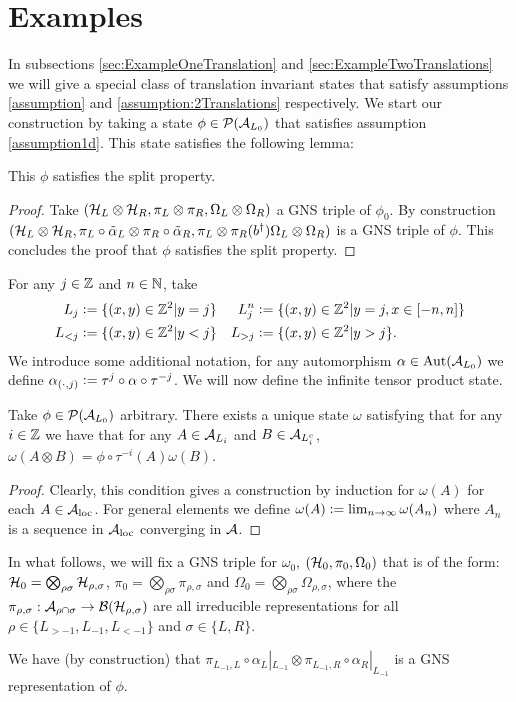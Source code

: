 \documentclass[11pt,a4paper,twoside]{article}
\numberwithin{equation}{section}
\begin{document}
	\section{Examples}\label{sec:examples}
	In subsections \ref{sec:ExampleOneTranslation} and \ref{sec:ExampleTwoTranslations} we will give a special class of translation invariant states that satisfy assumptions \ref{assumption} and \ref{assumption:2Translations} respectively. We start our construction by taking a state $\phi\in\PP(\AA_{L_0})$ that satisfies assumption \ref{assumption1d}. This state satisfies the following lemma:
	\begin{lemma}\label{lem:phiExampleConsistentWithConjectureSplitProperty}
		This $\phi$ satisfies the split property.
	\end{lemma}
	\begin{proof}
		Take $(\HH_L\otimes\HH_R,\pi_L\otimes\pi_R,\Omega_L\otimes\Omega_R)$ a GNS triple of $\phi_0$. By construction $(\HH_L\otimes\HH_R,\pi_L\circ\tilde\alpha_L\otimes\pi_R\circ\tilde\alpha_R,\pi_L\otimes\pi_R(b^\dagger)\Omega_L\otimes\Omega_R)$ is a GNS triple of $\phi$. This concludes the proof that $\phi$ satisfies the split property.
	\end{proof}
	For any $j\in\ZZ$ and $n\in\NN$, take
	\begin{align}
		L_j&\defeq \{(x,y)\in\ZZ^2|y=j\}&L_{j}^{n}&\defeq \{(x,y)\in\ZZ^2|y=j,x\in[-n,n]\}\\
		L_{<j}&\defeq \{(x,y)\in\ZZ^2|y<j\}&L_{>j}&\defeq \{(x,y)\in\ZZ^2|y>j\}.
	\end{align}
	We introduce some additional notation, for any automorphism $\alpha\in\Aut{\AA_{L_0}}$ we define $\alpha_{(\cdot,j)}\defeq \tau^j\circ\alpha\circ\tau^{-j}$. We will now define the infinite tensor product state.
	\begin{definition}\label{def:InfiniteTensorProductState}
		Take $\phi\in\PP(\AA_{L_0})$ arbitrary. There exists a unique state $\omega$ satisfying that for any $i\in\ZZ$ we have that for any $A\in\AA_{L_i}$ and $B\in\AA_{L_i^c}$, $\omega(A\otimes B)=\phi\circ\tau^{-i}(A)\omega(B)$.
	\end{definition}
	\begin{proof}
		Clearly, this condition gives a construction by induction for $\omega(A)$ for each $A\in\AA_{\text{loc}}$. For general elements we define $\omega(A)\defeq \lim_{n\rightarrow\infty}\omega(A_n)$ where $A_n$ is a sequence in $\AA_{\text{loc}}$ converging in $\AA$.
	\end{proof}
	In what follows, we will fix a GNS triple for $\omega_0$, $(\HH_0,\pi_0,\Omega_0)$ that is of the form: $\HH_0=\bigotimes_{\rho\sigma}\HH_{\rho,\sigma}$, $\pi_0=\bigotimes_{\rho\sigma}\pi_{\rho,\sigma}$ and $\Omega_0=\bigotimes_{\rho\sigma}\Omega_{\rho,\sigma}$, where the $\pi_{\rho,\sigma}:\AA_{\rho\cap\sigma}\rightarrow\BB(\HH_{\rho,\sigma})$ are all irreducible representations for all $\rho\in \{L_{>-1},L_{-1},L_{<-1}\}$ and $\sigma\in\{L,R\}$.
	\begin{remark}\label{rem:GNS_One_Dimensional}
		We have (by construction) that $\pi_{L_{-1},L}\circ\alpha_L|_{L_{-1}}\otimes \pi_{L_{-1},R}\circ\alpha_R|_{L_{-1}}$ is a GNS representation of $\phi$. 
	\end{remark}
\end{document}
